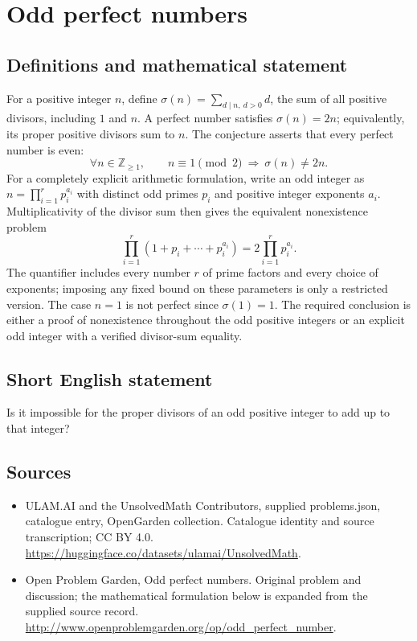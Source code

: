 \documentclass[11pt,a4paper]{article}
\begin{document}
\section*{Odd perfect numbers}\label{statement}

\subsection{Definitions and mathematical statement}
For a positive integer $n$, define
$\sigma(n)=\sum_{d\mid n,\ d>0}d$, the sum of all positive divisors,
including $1$ and $n$. A perfect number satisfies $\sigma(n)=2n$;
equivalently, its proper positive divisors sum to $n$. The conjecture
asserts that every perfect number is even:
\[
 \forall n\in\mathbb Z_{\ge1},\qquad
 n\equiv1\pmod2\ \Longrightarrow\ \sigma(n)\ne2n.
\]
For a completely explicit arithmetic formulation, write an odd integer
as $n=\prod_{i=1}^r p_i^{a_i}$ with distinct odd primes $p_i$ and
positive integer exponents $a_i$. Multiplicativity of the divisor sum
then gives the equivalent nonexistence problem
\[
 \prod_{i=1}^r(1+p_i+\cdots+p_i^{a_i})
       =2\prod_{i=1}^r p_i^{a_i}.
\]
The quantifier includes every number $r$ of prime factors and every
choice of exponents; imposing any fixed bound on these parameters is
only a restricted version. The case $n=1$ is not perfect since
$\sigma(1)=1$. The required conclusion is either a proof of
nonexistence throughout the odd positive integers or an explicit odd
integer with a verified divisor-sum equality.
\subsection{Short English statement}
Is it impossible for the proper divisors of an odd positive integer to add up to that integer?
\subsection{Sources}
\begin{itemize}
\item[S1] ULAM.AI and the UnsolvedMath Contributors, supplied problems.json, catalogue entry, OpenGarden collection. Catalogue identity and source transcription; CC BY 4.0.
\url{https://huggingface.co/datasets/ulamai/UnsolvedMath}.
\item[S2] Open Problem Garden, Odd perfect numbers. Original problem and discussion; the mathematical formulation below is expanded from the supplied source record.
\url{http://www.openproblemgarden.org/op/odd_perfect_number}.
\end{itemize}
\end{document}
